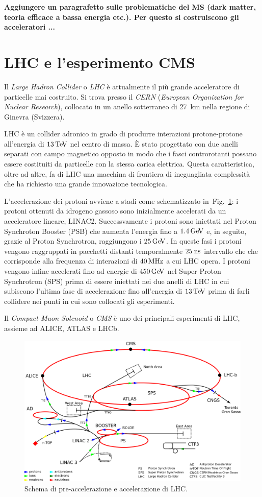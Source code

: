 {\bf Aggiungere un paragrafetto sulle problematiche del MS (dark matter, teoria efficace a bassa energia etc.). Per questo si costruiscono gli acceleratori ...}

\section{LHC e l'esperimento CMS}
Il {\em Large Hadron Collider} o {\em LHC} è attualmente il più grande acceleratore di particelle mai costruito. Si trova presso il {\em CERN} ({\em European Organization for Nuclear Research}), collocato in un anello sotterraneo di 27~km nella regione di Ginevra (Svizzera). 

LHC \`e un collider adronico in grado di produrre interazioni protone-protone all'energia di $13{\rm \, Te\kern-0.125em V}$ nel centro di massa. \`E stato progettato con due anelli separati con campo magnetico opposto in modo che i fasci controrotanti possano essere costituiti da particelle con la stessa carica elettrica. Questa caratteristica, oltre ad altre, fa di LHC una macchina di frontiera di ineguagliata complessit\`a che ha richiesto una grande innovazione tecnologica. 

L'accelerazione dei protoni avviene a stadi come schematizzato in~Fig.~\ref{fig:LHC}: i protoni ottenuti da idrogeno gassoso sono inizialmente accelerati da un acceleratore lineare, LINAC2. Successvamente i protoni sono iniettati nel Proton Synchroton Booster (PSB) che aumenta l'energia fino a $1.4{\rm \, Ge\kern-0.125em V}$ e, in seguito, grazie al Proton Synchrotron, raggiungono i $25{\rm \, Ge\kern-0.125em V}$. In queste fasi i protoni vengono raggruppati in pacchetti distanti temporalmente $25\rm \; ns$ intervallo che che corrisponde alla frequenza di interazioni di $40{\rm \, MHz}$ a cui LHC opera. 
I protoni vengono infine accelerati fino ad energie di $450{\rm \, Ge\kern-0.125em V}$ nel Super Proton Synchrotron (SPS) prima di essere iniettati nei due anelli di LHC in cui subiscono l'ultima fase di accelerazione fino all'energia di $13{\rm \, Te\kern-0.125em V}$ prima di farli collidere nei punti in cui sono collocati gli esperimenti.

Il {\em Compact Muon Solenoid} o {\em CMS} è uno dei principali esperimenti di LHC, assieme ad ALICE, ATLAS e LHCb. 

\begin{figure}
\centering
\includegraphics[scale=0.25]{Immagini/LHC}
\caption{Schema di pre-accelerazione e accelerazione di LHC.}
\label{fig:LHC}
\end{figure}

